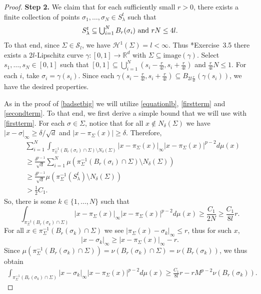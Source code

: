 \documentclass[preprint, reqno]{amsart}
\renewcommand{\subset}{\subseteq}
\theoremstyle{definition}
\numberwithin{equation}{section}
\begin{document}
\begin{proof}
  \medskip

  \textbf{Step 2.} We claim that for each sufficiently small $r>0$,
  there exists a finite collection of points $\sigma_1, \dots,
  \sigma_N \in S_\lambda^t$ such that
  \begin{equation}
    \hbox{$ S_\lambda^t \subseteq \bigcup_{i=1}^N B_r(\sigma_i)$ and
      $r N \leq 4l$.} \label{eq:B-r-sigma-i}
  \end{equation}
  To that end, since $\Sigma \in \mathcal S_l$, we have $\mathcal
  H^1(\Sigma) = l < \infty$. Thus \cite{Falconer86}*{Exercise\ 3.5}
  there exists a $2l$-Lipschitz curve $\gamma: [0,1] \to \mathbb{R}^d$
  with $\Sigma \subseteq \mathrm{image}(\gamma)$. Select $s_1, \dots,
  s_N \in [0,1]$ such that $[0,1] \subset
  \bigcup_{i=1}^N(s_i-\frac{r}{4l}, s_i + \frac{r}{4l})$ and
  $\frac{r}{4l} N \leq 1$. For each $i$, take $\sigma_i =
  \gamma(s_i)$. Since each $\gamma(s_i - \frac{r}{4l}, s_i +
  \frac{r}{4l}) \subseteq B_{2l\frac{r}{4l}}(\gamma(s_i))$, we have
  the desired properties.


  As in the proof of \cref{badsetbig} we will utilize
  \eqref{equationlb}, \eqref{firstterm} and \eqref{secondterm}. To
  that end, we first derive a simple bound that we will use with
  \eqref{firstterm}. For each $\sigma \in \Sigma$, notice that for all
  $x \not \in N_\delta(\Sigma)$ we have $|x-\sigma|_\infty \ge
  \delta/\sqrt{d}$ and $\lvert x - \pi_\Sigma(x) \rvert \geq \delta$.
  Therefore,
  \begin{align*}
    & \sum_{i =1}^N \int_{\pi_{\Sigma}^{-1}(B_r(\sigma_i)\cap
      \Sigma)\setminus N_{\delta}(\Sigma)} |x-\pi_\Sigma (x)|_{\infty}
      |x - \pi_{\Sigma}(x)|^{p-2}d\mu(x) \\
    &\geq \frac{\delta^{p-1}}{\sqrt{d}} \sum_{i=1}^N
      \mu(\pi_{\Sigma}^{-1}(B_r(\sigma_i)\cap \Sigma)\setminus
      N_{\delta}(\Sigma)) \\
    & \geq \frac{\delta^{p-1}}{\sqrt{d}}
      \mu(\pi_{\Sigma}^{-1}(S_\lambda^t) \setminus N_{\delta}(\Sigma))
    \\
    & > \frac{1}{2}C_1.
  \end{align*}
  So, there is some $k \in \{1, \dots, N\}$ such that
  \begin{equation*}
    \int_{\pi_{\Sigma}^{-1}(B_r(\sigma_k) \cap \Sigma)} |x
    -\pi_\Sigma(x)|_{\infty} |x-\pi_{\Sigma}(x)|^{p-2} d\mu(x) \geq
    \frac{C_1}{2N} \geq \frac{C_1}{8l}r.
  \end{equation*}
  For all $x \in \pi_\Sigma^{-1}(B_r(\sigma_k) \cap \Sigma)$ we see
  $|\pi_\Sigma(x) - \sigma_k|_\infty \le r$, thus for such $x$,
  \[
    |x-\sigma_k|_\infty \ge |x-\pi_\Sigma(x)|_\infty-r.
  \]
  Since $\mu(\pi_\Sigma^{-1}(B_r(\sigma_k) \cap \Sigma)) =
  \nu(B_r(\sigma_k) \cap \Sigma) = \nu(B_r(\sigma_k))$, we thus obtain
  \begin{align}\label{eq:sigma-k-integral}
    \int_{\pi_{\Sigma}^{-1}(B_r(\sigma_k)\cap \Sigma)}|x
    -\sigma_k|_{\infty}|x-\pi_{\Sigma}(x)|^{p-2}d\mu(x) \geq
    \frac{C_1}{8l}r -r M^{p-2} \nu (B_r(\sigma_k)).
  \end{align}


\end{proof}
\end{document}
